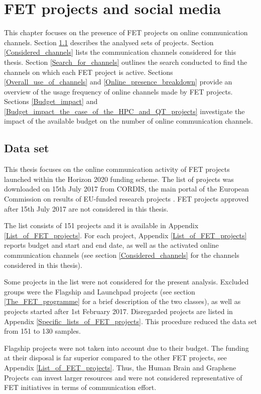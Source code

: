 \chapter{FET projects and social media} \label{FET_projects_and_social_media}
This chapter focuses on the presence of FET projects on online communication channels. Section \ref{Data_set} describes the analysed sets of projects. Section \ref{Considered_channels} lists the communication channels considered for this thesis. Section \ref{Search_for_channels} outlines the search conducted to find the channels on which each FET project is active. Sections \ref{Overall_use_of_channels} and \ref{Online_presence_breakdown} provide an overview of the usage frequency of online channels made by FET projects. Sections \ref{Budget_impact} and \ref{Budget_impact_the_case_of_the_HPC_and_QT_projects} investigate the impact of the available budget on the number of online communication channels.

\section{Data set} \label{Data_set}
This thesis focuses on the online communication activity of FET projects launched within the Horizon 2020 funding scheme. The list of projects was downloaded on 15th July 2017 from CORDIS, the main portal of the European Commission on results of EU-funded research projects \cite{CORDIS}. FET projects approved after 15th July 2017 are not considered in this thesis.

The list consists of 151 projects and it is available in Appendix \ref{List_of_FET_projects}. For each project, Appendix \ref{List_of_FET_projects} reports budget and start and end date, as well as the activated online communication channels (see section \ref{Considered_channels} for the channels considered in this thesis).   

Some projects in the list were not considered for the present analysis. Excluded groups were the Flagship and Launchpad projects (see section \ref{The_FET_programme} for a brief description of the two classes), as well as projects started after 1st February 2017. Disregarded projects are listed in Appendix \ref{Specific_lists_of_FET_projects}. This procedure reduced the data set from 151 to 130 samples.

Flagship projects were not taken into account due to their budget. The funding at their disposal is far superior compared to the other FET projects, see Appendix \ref{List_of_FET_projects}. Thus, the Human Brain and Graphene Projects can invest larger resources and were not considered representative of FET initiatives in terms of communication effort. 

